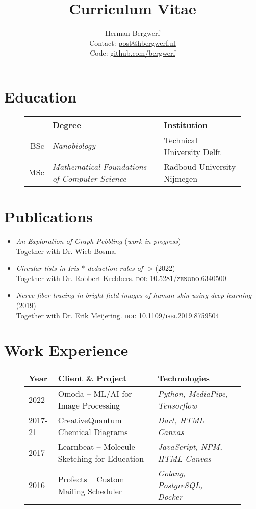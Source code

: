 \documentclass[12pt]{article}
\date{}
\title{Curriculum Vitae}
\author{Herman Bergwerf\\%
{\small Contact: \url{post@hbergwerf.nl}}\\%
{\small Code: \url{github.com/bergwerf}}}
\begin{document}
\maketitle

\section*{Education}

\begin{figure}[h]
\centering
\begin{tabular}{rll}
\toprule
& {\bf Degree} & {\bf Institution}\\
\midrule
BSc & \emph{Nanobiology} & Technical University Delft\\
MSc & \emph{Mathematical Foundations of Computer Science} & Radboud University Nijmegen\\
\bottomrule
\end{tabular}
\end{figure}

\section*{Publications}

\begin{itemize}[--,labelsep=3mm,leftmargin=*]
\item \emph{An Exploration of Graph Pebbling} (\emph{work in progress})\\
Together with Dr. Wieb Bosma.
\item \emph{Circular lists in Iris $\ast$ deduction rules of~\,$\triangleright$} (2022)\\
Together with Dr. Robbert Krebbers. \textsc{\href{https://doi.org/10.5281/zenodo.6340500}{doi: 10.5281/zenodo.6340500}}
\item \emph{Nerve fiber tracing in bright-field images of human skin using deep learning} (2019)\\
Together with Dr. Erik Meijering. \textsc{\href{https://ieeexplore.ieee.org/document/8759504}{doi: 10.1109/isbi.2019.8759504}}
\end{itemize}

\section*{Work Experience}

\begin{figure}[h]
\centering
\begin{tabular}{llll}
\toprule
{\bfseries Year} & {\bfseries Client \& Project} & {\bfseries Technologies}\\
\midrule
2022 & Omoda -- ML/AI for Image Processing & \emph{Python, MediaPipe, Tensorflow}\\
2017-21 & CreativeQuantum -- Chemical Diagrams & \emph{Dart, HTML Canvas}\\
2017 & Learnbeat -- Molecule Sketching for Education & \emph{JavaScript, NPM, HTML Canvas}\\
2016 & Profects -- Custom Mailing Scheduler & \emph{Golang, PostgreSQL, Docker}\\
\bottomrule
\end{tabular}
\end{figure}

\end{document}
